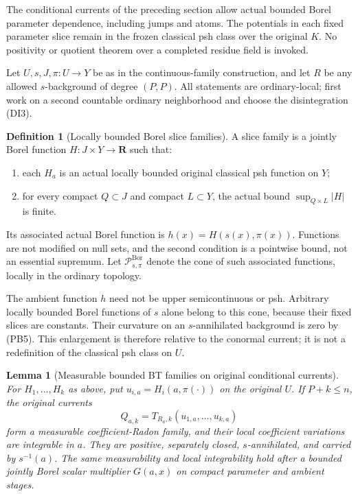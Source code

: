 \documentclass[11pt,a4paper]{article}
\numberwithin{equation}{section}
\newtheorem{lemma}[theorem]{Lemma}
\theoremstyle{definition}
\newtheorem{definition}[theorem]{Definition}
\theoremstyle{remark}
\begin{document}
The conditional currents of the preceding section allow actual
bounded Borel parameter dependence, including jumps and atoms.
The potentials in each fixed parameter slice remain in the frozen
classical psh class over the original $K$. No positivity or quotient
theorem over a completed residue field is invoked.

Let $U,s,J,\pi:U\to Y$ be as in the continuous-family construction,
and let $R$ be any allowed $s$-background of degree $(P,P)$.
All statements are ordinary-local; first work on a second countable
ordinary neighborhood and choose the disintegration (DI3).

\begin{definition}[Locally bounded Borel slice families]
\label{def:r12-bounded-Borel-slice-families}
A slice family is a jointly Borel function
$H:J\times Y\to\mathbf R$ such that:
\begin{enumerate}
\item each $H_a$ is an actual locally bounded original classical
psh function on $Y$;
\item for every compact $Q\subset J$ and compact $L\subset Y$,
the actual bound $\sup_{Q\times L}|H|$ is finite.
\end{enumerate}
Its associated actual Borel function is
$h(x)=H(s(x),\pi(x))$. Functions are not modified on null sets,
and the second condition is a pointwise bound, not an essential
supremum. Let $\mathcal P^{\mathrm{Bor}}_{s,\pi}$ denote the cone
of such associated functions, locally in the ordinary topology.
\end{definition}

The ambient function $h$ need not be upper semicontinuous or psh.
Arbitrary locally bounded Borel functions of $s$ alone belong to
this cone, because their fixed slices are constants. Their
curvature on an $s$-annihilated background is zero by (PB5).
This enlargement is therefore relative to the conormal current;
it is not a redefinition of the classical psh class on $U$.

\begin{lemma}[Measurable bounded BT families on original conditional currents]
\label{lem:r12-measurable-original-BT-families}
For $H_1,\ldots,H_k$ as above, put
$u_{i,a}=H_i(a,\pi(\cdot))$ on the original $U$. If $P+k\le n$,
the original currents
\[
                  Q_{a,k}=T_{R_a,k}(u_{1,a},\ldots,u_{k,a})
 \tag{BF1}
\]
form a measurable coefficient-Radon family, and their local
coefficient variations are integrable in $a$. They are positive,
separately closed, $s$-annihilated, and carried by $s^{-1}(a)$.
The same measurability and local integrability hold after a bounded
jointly Borel scalar multiplier $G(a,x)$ on compact parameter and
ambient stages.
\end{lemma}
\end{document}
